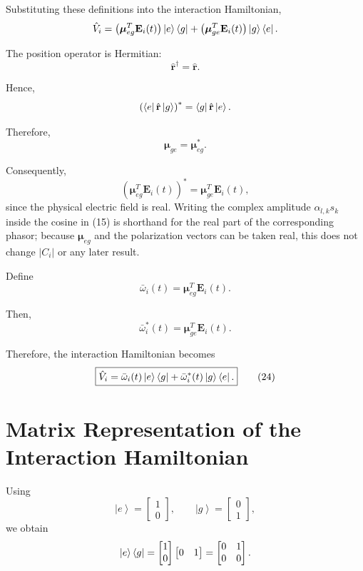 \documentclass[12pt,a4paper]{article}
\newcommand{\ketg}{\left|g\right\rangle}
\newcommand{\kete}{\left|e\right\rangle}
\begin{document}
Substituting these definitions into the interaction Hamiltonian,
\[
\hat V_i
=
\left(
\boldsymbol{\mu}_{eg}^{T}
\mathbf E_i(t)
\right)
\kete\bra g
+
\left(
\boldsymbol{\mu}_{ge}^{T}
\mathbf E_i(t)
\right)
\ketg\bra e.
\]

The position operator is Hermitian:
\[
\hat{\mathbf r}^{\dagger}
=
\hat{\mathbf r}.
\]

Hence,
\[
\left(
\bra e\hat{\mathbf r}\ketg
\right)^{*}
=
\bra g\hat{\mathbf r}\kete.
\]

Therefore,
\[
\boldsymbol{\mu}_{ge}
=
\boldsymbol{\mu}_{eg}^{*}.
\]

Consequently,
\[
\left(
\boldsymbol{\mu}_{eg}^{T}\mathbf E_i(t)
\right)^{*}
=
\boldsymbol{\mu}_{ge}^{T}\mathbf E_i(t),
\]
since the physical electric field is real. Writing the complex amplitude
\(\alpha_{l,k}s_k\) inside the cosine in (15) is shorthand for the real part of
the corresponding phasor; because \(\boldsymbol\mu_{eg}\) and the polarization
vectors can be taken real, this does not change \(|C_i|\) or any later result.

Define
\begin{equation}
\boxed{
\bar{\omega}_i(t)
=
\boldsymbol{\mu}_{eg}^{T}\mathbf E_i(t).
}
\tag{23}
\end{equation}

Then,
\[
\bar{\omega}_i^{*}(t)
=
\boldsymbol{\mu}_{ge}^{T}\mathbf E_i(t).
\]

Therefore, the interaction Hamiltonian becomes
\begin{equation}
\boxed{
\hat V_i
=
\bar{\omega}_i(t)
\kete\bra g
+
\bar{\omega}_i^{*}(t)
\ketg\bra e.
}
\tag{24}
\end{equation}


\section{Matrix Representation of the Interaction Hamiltonian}

Using
\[
\kete
=
\begin{bmatrix}
1\\
0
\end{bmatrix},
\qquad
\ketg
=
\begin{bmatrix}
0\\
1
\end{bmatrix},
\]
we obtain
\[
\kete\bra g
=
\begin{bmatrix}
1\\
0
\end{bmatrix}
\begin{bmatrix}
0&1
\end{bmatrix}
=
\begin{bmatrix}
0&1\\
0&0
\end{bmatrix}.
\]
\end{document}
